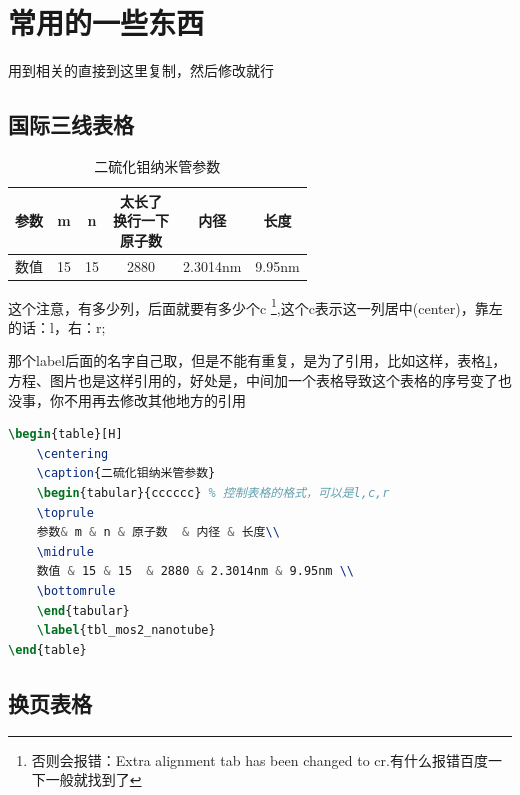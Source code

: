\documentclass[AutoFakeBold]{LZUThesis}
\begin{document}
\section{常用的一些东西} %
\label{sec:常用的一些东西}

用到相关的直接到这里复制，然后修改就行

\subsection{国际三线表格} %
\label{sub:国际三线表格}

\begin{table}[H]
    \centering
    \caption{二硫化钼纳米管参数}
    \begin{tabular}{cccccc} %
        \toprule
        参数 & m  & n  & \tabincell{c}{太长了                     \\换行一下\\原子数}  & 内径 & 长度\\
        \midrule
        数值 & 15 & 15 & 2880              & 2.3014nm & 9.95nm \\
        \bottomrule
    \end{tabular}
    \label{tbl_mos2_nanotube}
\end{table}

这个注意，有多少列，后面就要有多少个c \footnote{否则会报错：Extra alignment tab has been changed to cr.有什么报错百度一下一般就找到了},这个c表示这一列居中(center)，靠左的话：l，右：r;

那个label后面的名字自己取，但是不能有重复，是为了引用，比如这样，表格\ref{tbl_mos2_nanotube}，方程、图片也是这样引用的，好处是，中间加一个表格导致这个表格的序号变了也没事，你不用再去修改其他地方的引用

\begin{lstlisting}[language = tex]
\begin{table}[H]
    \centering
    \caption{二硫化钼纳米管参数}
    \begin{tabular}{cccccc} % 控制表格的格式，可以是l,c,r
    \toprule
    参数& m & n & 原子数  & 内径 & 长度\\
    \midrule
    数值 & 15 & 15  & 2880 & 2.3014nm & 9.95nm \\
    \bottomrule
    \end{tabular}
    \label{tbl_mos2_nanotube}
\end{table}
\end{lstlisting}

\subsection{换页表格} %
\end{document}
